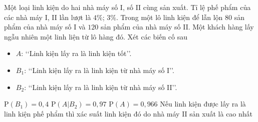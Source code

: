 \begin{ex}%
Một loại linh kiện do hai nhà máy số I, số II cùng sản xuất. Tỉ lệ phế phẩm của các nhà máy I, II lần lượt là $4\%$; $3\%$. Trong một lô linh kiện để lẫn lộn $80$ sản phẩm của nhà máy số I và $120$ sản phẩm của nhà máy số II. Một khách hàng lấy ngẫu nhiên một linh liện từ lô hàng đó. Xét các biến cố sau
\begin{itemize}
				\item $A$: \lq\lq Linh kiện lấy ra là linh kiện tốt\rq\rq.
				\item $B_1$: \lq\lq Linh kiện lấy ra là linh kiện từ nhà máy số I\rq\rq.
				\item $B_2$: \lq\lq Linh kiện lấy ra là linh kiện từ nhà máy số II\rq\rq.
\end{itemize}
\choiceTF
{\True $\mathrm{P}(B_1)=0{,}4$}
{\True $\mathrm{P}\left(A|B_2\right) =  0{,}97$}
{\True $\mathrm{P}(A) = 0{,}966$}
{Nếu linh kiện được lấy ra là linh kiện phế phẩm thì xác suất linh kiện đó do nhà máy II sản xuất là cao nhất}
\end{ex}

